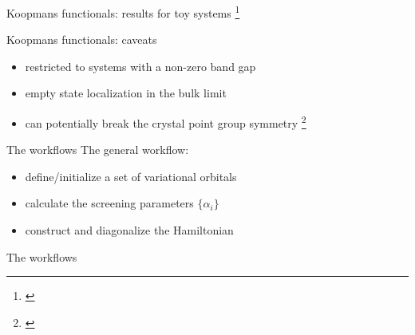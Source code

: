 \documentclass[xcolor=table,aspectratio=169]{beamer}
\newcommand\blfootcite[1]{%
  \begingroup
  \renewcommand\thefootnote{}\footnote{\hspace{-4ex}\cite{#1}}%
  \addtocounter{footnote}{-1}%
  \endgroup
}
\numberwithin{equation}{section}
\begin{document}
\begin{frame}{Koopmans functionals: results for toy systems}
   \blfootcite{Schubert2023}
\end{frame}

\begin{frame}{Koopmans functionals: caveats}

   \begin{itemize}[<+(1)->]
      \item restricted to systems with a non-zero band gap
      \item empty state localization in the bulk limit
      \item can potentially break the crystal point group symmetry\blfootcite{Su2020}
   \end{itemize}
\end{frame}

\begin{frame}{The workflows}
   The general workflow:
   \begin{itemize}
      \item define/initialize a set of variational orbitals
      \item calculate the screening parameters $\{\alpha_i\}$
      \item construct and diagonalize the Hamiltonian
   \end{itemize}
\end{frame}

\begin{frame}{The workflows}

   \vspace{1ex}


   \vspace{-1.5ex}


\end{frame}
\end{document}
